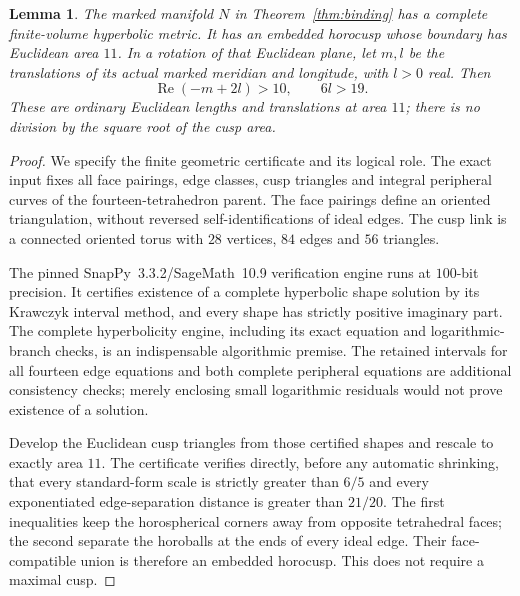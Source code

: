 \documentclass[11pt]{article}
\newtheorem{lemma}[theorem]{Lemma}
\begin{document}
\begin{lemma}\label{lem:geometry}
The marked manifold $N$ in Theorem~\ref{thm:binding} has a complete
finite-volume hyperbolic metric. It has an embedded horocusp whose
boundary has Euclidean area $11$. In a rotation of that Euclidean
plane, let $m,l$ be the translations of its actual marked meridian
and longitude, with $l>0$ real. Then
\begin{equation}\label{eq:bounds}
                   \operatorname{Re}(-m+2l)>10,\qquad 6l>19.
\end{equation}
These are ordinary Euclidean lengths and translations at area $11$;
there is no division by the square root of the cusp area.
\end{lemma}
\begin{proof}
We specify the finite geometric certificate and its logical role.
The exact input fixes all face pairings, edge classes, cusp triangles
and integral peripheral curves of the fourteen-tetrahedron parent.
The face pairings define an oriented triangulation, without reversed
self-identifications of ideal edges. The cusp link is a connected
oriented torus with $28$ vertices, $84$ edges and $56$ triangles.

The pinned SnapPy~3.3.2/SageMath~10.9 verification engine runs at
$100$-bit precision. It certifies existence of a complete hyperbolic
shape solution by its Krawczyk interval method, and every shape has
strictly positive imaginary part. The complete hyperbolicity engine,
including its exact equation and logarithmic-branch checks, is an
indispensable algorithmic premise. The retained intervals for all
fourteen edge equations and both complete peripheral equations are
additional consistency checks; merely enclosing small logarithmic
residuals would not prove existence of a solution.

Develop the Euclidean cusp triangles from those certified shapes and
rescale to exactly area $11$. The certificate verifies directly,
before any automatic shrinking, that every standard-form scale is
strictly greater than $6/5$ and every exponentiated edge-separation
distance is greater than $21/20$. The first inequalities keep the
horospherical corners away from opposite tetrahedral faces; the
second separate the horoballs at the ends of every ideal edge.
Their face-compatible union is therefore an embedded horocusp.
This does not require a maximal cusp.


\end{proof}
\end{document}
